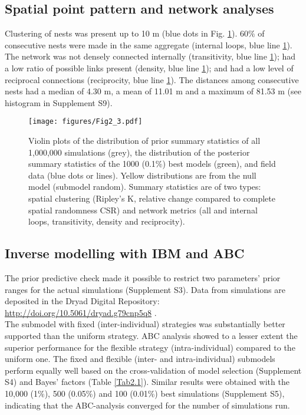 \documentclass[10pt, twoside]{book} %
\begin{document}
	\subsection{Spatial point pattern and network analyses}
	Clustering of nests was present up to 10 m (blue dots in Fig. \ref{fig2.3}). 60$\%$ of consecutive nests were made in the same aggregate (internal loops, blue line \ref{fig2.3}). The network was not densely connected internally (transitivity, blue line \ref{fig2.3}); had a low ratio of possible links present (density, blue line \ref{fig2.3}); and had a low level of reciprocal connections (reciprocity, blue line \ref{fig2.3}). The distances among consecutive nests had a median of 4.30 m, a mean of 11.01 m and a maximum of 81.53 m (see histogram in Supplement S9).\\
	
	\begin{figure}[h!]
		\begin{center}
			\texttt{[image: figures/Fig2\_3.pdf]}
		\end{center}
		\begin{footnotesize}
			\caption{Violin plots of the distribution of prior summary statistics of all 1,000,000 simulations (grey), the distribution of the posterior summary statistics of the 1000 (0.1$\%$) best models (green), and field data (blue dots or lines). Yellow distributions are from the null model (submodel random). Summary statistics are of two types: spatial clustering (Ripley's K, relative change compared to complete spatial randomness CSR) and network metrics (all and internal loops, transitivity, density and reciprocity). \label{fig2.3}}
		\end{footnotesize}
		\end{figure}
	\clearpage
	
	\subsection{Inverse modelling with IBM and ABC}
	The prior predictive check made it possible to restrict two parameters' prior ranges for the actual simulations (Supplement S3). Data from simulations are deposited in the Dryad Digital Repository: \url{http://doi.org/10.5061/dryad.g79cnp5q8} \citep{batsleer2021}.\\
	
	The submodel with fixed (inter-individual) strategies was substantially better supported than the uniform strategy. ABC analysis showed to a lesser extent the superior performance for the flexible strategy (intra-individual) compared to the uniform one. The fixed and flexible (inter- and intra-individual) submodels perform equally well based on the cross-validation of model selection (Supplement S4) and Bayes' factors (Table \ref{Tab2.1}). Similar results were obtained with the 10,000 (1$\%$), 500 (0.05$\%$) and 100 (0.01$\%$) best simulations (Supplement S5), indicating that the ABC-analysis converged for the number of simulations run.\\
	
\end{document}
